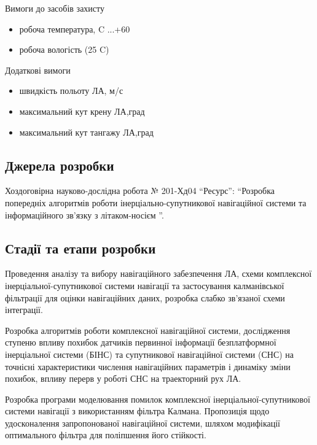 \documentclass[ukrainian,utf8,simple,floatsingle,hpadding=5mm]{eskdtext}
\begin{document}
Вимоги до засобів захисту
\begin{itemize}
    \item робоча температура, C   ...+60
    \item робоча вологість (25 C)    
\end{itemize}

Додаткові вимоги
\begin{itemize}
    \item швидкість польоту ЛА, м/с  
    \item максимальний кут крену ЛА,град 
    \item максимальний кут тангажу ЛА,град 
\end{itemize}




\subsection*{Джерела розробки}

Хоздоговірна науково-дослідна робота № 201-Хд04 
“Ресурс”: “Розробка попередніх алгоритмів роботи 
інерціально-супутникової навігаційної системи та 
інформаційного зв'язку з літаком-носієм ”.


\subsection*{Стадії та етапи розробки}

Проведення аналізу та вибору навігаційного забезпечення ЛА, 
схеми комплексної інерціальної-супутникової системи навігації 
та застосування калманівської фільтрації для оцінки навігаційних 
даних, розробка слабко зв’язаної схеми інтеграції.

Розробка алгоритмів роботи комплексної навігаційної системи, 
дослідження ступеню впливу похибок датчиків первинної інформації  
безплатформної інерціальної системи (БІНС) та супутникової 
навігаційної системи (СНС) на точнісні характеристики числення 
навігаційних параметрів і динаміку зміни похибок, впливу перерв 
у роботі СНС на траекторний рух ЛА.

Розробка програми моделювання помилок комплексної 
інерціальної-супутникової системи навігації з використанням 
фільтра Калмана. Пропозиція щодо удосконалення запропонованої 
навігаційної системи, шляхом модифікації оптимального фільтра 
для поліпшення його стійкості.
\end{document}
